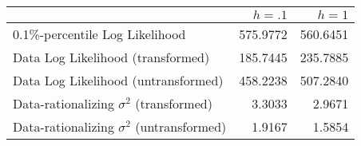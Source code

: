 \begin{tabular}{lrr}
\toprule
{} &  $h = .1$ &  $h = 1$ \\
\midrule
0.1\%-percentile Log Likelihood               &  575.9772 & 560.6451 \\
Data Log Likelihood (transformed)             &  185.7445 & 235.7885 \\
Data Log Likelihood (untransformed)           &  458.2238 & 507.2840 \\
Data-rationalizing $\sigma^2$ (transformed)   &    3.3033 &   2.9671 \\
Data-rationalizing $\sigma^2$ (untransformed) &    1.9167 &   1.5854 \\
\bottomrule
\end{tabular}
